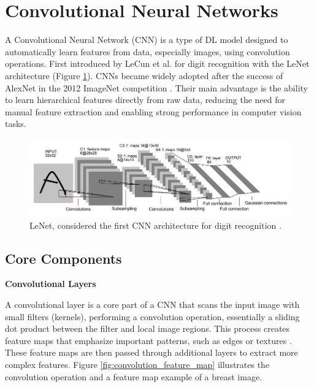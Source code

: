 \documentclass[a4paper,10pt]{book}
\begin{document}
\section{Convolutional Neural Networks}

A Convolutional Neural Network (CNN) is a type of DL model designed to automatically learn features from data, especially images, using convolution operations. First introduced by LeCun et al. for digit recognition \cite{lecun_gradient-based_1998} with the LeNet architecture (Figure \ref{fig:lenet}). CNNs became widely adopted after the success of AlexNet in the 2012 ImageNet competition \cite{NIPS2012_c399862d}. Their main advantage is the ability to learn hierarchical features directly from raw data, reducing the need for manual feature extraction and enabling strong performance in computer vision tasks.

\begin{figure}[h!]
    \centering
    \includegraphics[width=0.8\linewidth]{reports//assets/lenet.jpg}
    \caption[LeNet CNN]{LeNet, considered the first CNN architecture for digit recognition \cite{lecun_gradient-based_1998}.}
    \label{fig:lenet}
\end{figure}


\subsection{Core Components}

\textbf{Convolutional Layers}

A convolutional layer is a core part of a CNN that scans the input image with small filters (kernels), performing a convolution operation, essentially a sliding dot product between the filter and local image regions. This process creates feature maps that emphasize important patterns, such as edges or textures \cite{noauthor_what_2021}. These feature maps are then passed through additional layers to extract more complex features. Figure \ref{fig:convolution_feature_map} illustrates the convolution operation and a feature map example of a breast image.
\end{document}

